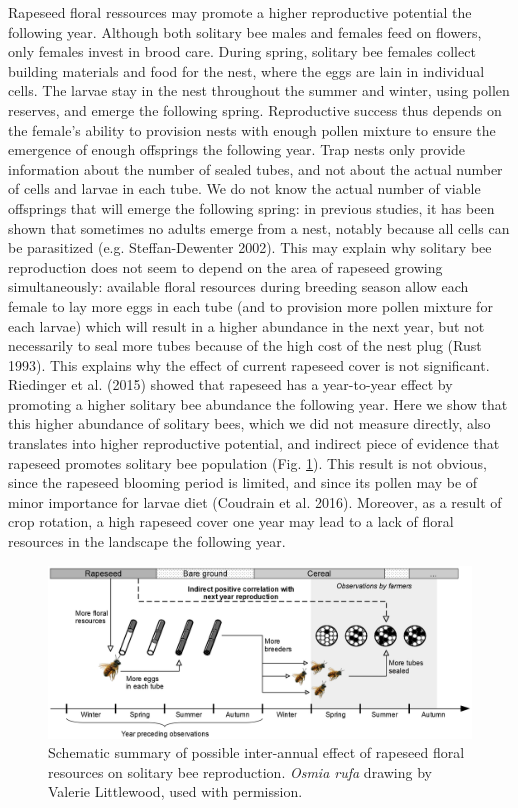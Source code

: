 \documentclass[smallextended]{svjour3}       %
\begin{document}
Rapeseed floral ressources may promote a higher reproductive potential
the following year. Although both solitary bee males and females feed on
flowers, only females invest in brood care. During spring, solitary bee
females collect building materials and food for the nest, where the eggs
are lain in individual cells. The larvae stay in the nest throughout the
summer and winter, using pollen reserves, and emerge the following
spring. Reproductive success thus depends on the female's ability to
provision nests with enough pollen mixture to ensure the emergence of
enough offsprings the following year. Trap nests only provide
information about the number of sealed tubes, and not about the actual
number of cells and larvae in each tube. We do not know the actual
number of viable offsprings that will emerge the following spring: in
previous studies, it has been shown that sometimes no adults emerge from
a nest, notably because all cells can be parasitized (e.g.
Steffan-Dewenter 2002). This may explain why solitary bee reproduction
does not seem to depend on the area of rapeseed growing simultaneously:
available floral resources during breeding season allow each female to
lay more eggs in each tube (and to provision more pollen mixture for
each larvae) which will result in a higher abundance in the next year,
but not necessarily to seal more tubes because of the high cost of the
nest plug (Rust 1993). This explains why the effect of current rapeseed
cover is not significant. Riedinger et al. (2015) showed that rapeseed
has a year-to-year effect by promoting a higher solitary bee abundance
the following year. Here we show that this higher abundance of solitary
bees, which we did not measure directly, also translates into higher
reproductive potential, and indirect piece of evidence that rapeseed
promotes solitary bee population (Fig. \ref{fig:schema}). This result is
not obvious, since the rapeseed blooming period is limited, and since
its pollen may be of minor importance for larvae diet (Coudrain et al.
2016). Moreover, as a result of crop rotation, a high rapeseed cover one
year may lead to a lack of floral resources in the landscape the
following year.

\begin{figure}[]
\includegraphics[width=1\linewidth]{solitary_bees_files/figure-latex/schema.png} \caption{Schematic summary of possible inter-annual effect of rapeseed floral resources on solitary bee reproduction. \emph{Osmia rufa} drawing by Valerie Littlewood, used with permission.}\label{fig:schema}
\end{figure}
\end{document}
